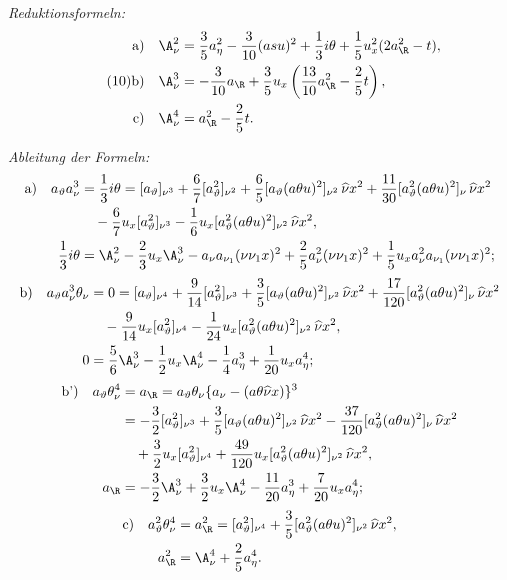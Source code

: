 \noindent\emph{Reduktionsformeln:}
\[
\tag{10}
\begin{aligned}
\text{a)}\quad \A_\nu^2
&=\frac35a_\eta^2-\frac3{10}(asu)^2+\frac13 i\theta
+\frac15u_x^2(2a_\R^2-t),\\
\text{b)}\quad \A_\nu^3
&=-\frac3{10}a_\R+\frac35u_x\left(\frac{13}{10}a_\R^2-\frac25t\right),\\
\text{c)}\quad \A_\nu^4&=a_\R^2-\frac25t.
\end{aligned}
\]

\noindent\emph{Ableitung der Formeln:}
\[
\begin{aligned}
\text{a)}\quad
 a_\vartheta a_\nu^3
&=\frac13 i\theta
=[a_\vartheta]_{\nu^3}+\frac67[a_\vartheta^2]_{\nu^2}
+\frac65[a_\vartheta(a\theta u)^2]_{\nu^2}\,\widehat{\nu}x^2
+\frac{11}{30}[a_\vartheta^2(a\theta u)^2]_{\nu}\,\widehat{\nu}x^2\\
&\quad-\frac67u_x[a_\vartheta^2]_{\nu^3}
-\frac16u_x[a_\vartheta^2(a\theta u)^2]_{\nu^2}\,\widehat{\nu}x^2,\\
\frac13 i\theta
&=\A_\nu^2-\frac23u_x\A_\nu^3-a_\nu a_{\nu_1}(\nu\nu_1x)^2
+\frac25a_\nu^2(\nu\nu_1x)^2
+\frac15u_xa_\nu^2a_{\nu_1}(\nu\nu_1x)^2;
\end{aligned}
\]
\[
\begin{aligned}
\text{b)}\quad
 a_\vartheta a_\nu^3\theta_\nu
&=0=[a_\vartheta]_{\nu^4}+\frac9{14}[a_\vartheta^2]_{\nu^3}
+\frac35[a_\vartheta(a\theta u)^2]_{\nu^2}\,\widehat{\nu}x^2
+\frac{17}{120}[a_\vartheta^2(a\theta u)^2]_{\nu}\,\widehat{\nu}x^2\\
&\quad-\frac9{14}u_x[a_\vartheta^2]_{\nu^4}
-\frac1{24}u_x[a_\vartheta^2(a\theta u)^2]_{\nu^2}\,\widehat{\nu}x^2,\\
0&=\frac56\A_\nu^3-\frac12u_x\A_\nu^4-\frac14a_\eta^3+\frac1{20}u_xa_\eta^4;
\end{aligned}
\]
\[
\begin{aligned}
\text{b')}\quad
 a_\vartheta\theta_\nu^4
&=a_\R=a_\vartheta\theta_\nu\{a_\nu-(a\theta\widehat{\nu}x)\}^3\\
&=-\frac32[a_\vartheta^2]_{\nu^3}
+\frac35[a_\vartheta(a\theta u)^2]_{\nu^2}\,\widehat{\nu}x^2
-\frac{37}{120}[a_\vartheta^2(a\theta u)^2]_{\nu}\,\widehat{\nu}x^2\\
&\quad+\frac32u_x[a_\vartheta^2]_{\nu^4}
+\frac{49}{120}u_x[a_\vartheta^2(a\theta u)^2]_{\nu^2}\,\widehat{\nu}x^2,\\
a_\R&=-\frac32\A_\nu^3+\frac32u_x\A_\nu^4-\frac{11}{20}a_\eta^3+\frac7{20}u_xa_\eta^4;
\end{aligned}
\]
\[
\begin{aligned}
\text{c)}\quad
 a_\vartheta^2\theta_\nu^4
&=a_\R^2=[a_\vartheta^2]_{\nu^4}+\frac35[a_\vartheta^2(a\theta u)^2]_{\nu^2}\,\widehat{\nu}x^2,\\
a_\R^2&=\A_\nu^4+\frac25a_\eta^4.
\end{aligned}
\]

